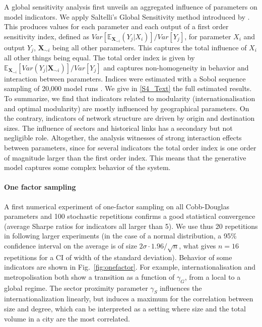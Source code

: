 \documentclass[10pt,letterpaper]{article}
\begin{document}
A global sensitivity analysis first unveils an aggregated influence of parameters on model indicators. We apply Saltelli's Global Sensitivity method introduced by \cite{saltelli2008global}. This produces values for each parameter and each output of a first order sensitivity index, defined as $Var\left[\mathbb{E}_{\mathbf{X}_{\sim i}}\left(Y_j | X_i\right)\right] / Var\left[Y_j\right]$, for parameter $X_i$ and output $Y_j$, $\mathbf{X}_{\sim i}$ being all other parameters. This captures the total influence of $X_i$ all other things being equal. The total order index is given by $\mathbb{E}_{\mathbf{X}_{\sim i}} \left[Var(Y_j | \mathbf{X}_{\sim i})\right] / Var\left[Y_j\right]$ and captures non-homogeneity in behavior and interaction between parameters. Indices were estimated with a Sobol sequence sampling of 20,000 model runs \cite{saltelli2010variance}. We give in \ref{S4_Text} the full estimated results. To summarize, we find that indicators related to modularity (internationalisation and optimal modularity) are mostly influenced by geographical parameters. On the contrary, indicators of network structure are driven by origin and destination sizes. The influence of sectors and historical links has a secondary but not negligible role. Altogether, the analysis witnesses of strong interaction effects between parameters, since for several indicators the total order index is one order of magnitude larger than the first order index. This means that the generative model captures some complex behavior of the system.



\paragraph{One factor sampling}

A first numerical experiment of one-factor sampling on all Cobb-Douglas parameters and 100 stochastic repetitions confirms a good statistical convergence (average Sharpe ratios for indicators all larger than 5). We use thus 20 repetitions in following larger experiments (in the case of a normal distribution, a 95\% confidence interval on the average is of size $2\sigma \cdot 1.96 / \sqrt{n}$, what gives $n=16$ repetitions for a CI of width of the standard deviation). Behavior of some indicators are shown in Fig.~\ref{fig:onefactor}. For example, internationalisation and metropolisation both show a transition as a function of $\gamma_G$, from a local to a global regime. The sector proximity parameter $\gamma_S$ influences the internationalization linearly, but induces a maximum for the correlation between size and degree, which can be interpreted as a setting where size and the total volume in a city are the most correlated.
\end{document}
